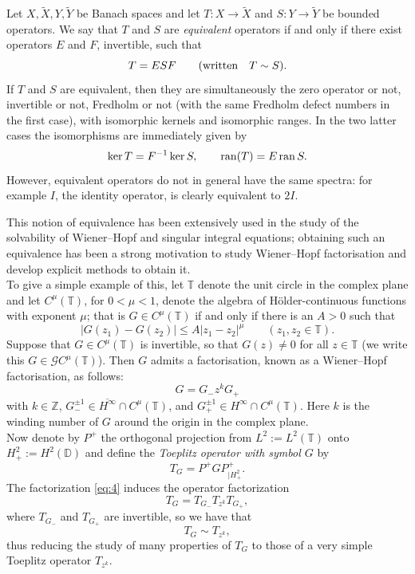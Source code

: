 \documentclass[11pt]{article}
\def\DD{\mathbb D}
\def\G{\mathcal G}
\def\TT{\mathbb T}
\def\ZZ{\mathbb Z}
\def\beq{\begin{equation}}
\def\eeq{\end{equation}}
\def\ol{\overline}
\def\wX{\widetilde X}
\def\wY{\widetilde Y}
\def\ker{\mathop{\rm ker}\nolimits}
\def\ran{\mathop{\rm ran}\nolimits}
\begin{document}
Let $X,\wX,Y,\wY$ be Banach spaces and let $T:X \to \wX$ and $S: Y \to \wY$ be bounded operators. We say that $T$ and $S$ are {\em equivalent\/} operators if and only if there exist operators $E$ and $F$, invertible, such that
\[
T=ESF \qquad (\hbox{written} \quad T \sim S).
\]
If $T$ and $S$ are equivalent, then they are simultaneously the zero operator or not,
invertible or not, Fredholm or not (with the same Fredholm defect numbers in
the first case), with isomorphic kernels and isomorphic ranges.
In the two latter cases the isomorphisms are immediately given by 
\[ 
\ker T=F^{-1}\ker S, \qquad \ran(T)= E \ran S. 
\]
However, equivalent operators do not in general have the same spectra: for example $I$, the identity
operator, is clearly equivalent to $2I$.

This notion of equivalence has been extensively  used in the study of the solvability of
Wiener--Hopf and singular integral equations; obtaining such an equivalence has been a strong motivation to study Wiener--Hopf factorisation and develop explicit methods to obtain it.\\

To give a   simple example of this, let $\TT$ denote the unit circle in the complex plane and
let $C^\mu(\TT)$, for $0< \mu < 1$, 
denote the algebra of H\"older-continuous functions with exponent $\mu$; that is
$G \in C^\mu(\TT)$ if and only if there is an $A>0$ such that
\[
 |G(z_1)-G(z_2)| \le A |z_1-z_2|^\mu \qquad (z_1,z_2 \in \TT).
\]
Suppose that $G \in C^\mu(\TT)$ is invertible, so that $G(z) \ne 0$ for all $z \in \TT$
(we write this $G \in \G C^\mu(\TT)$). Then $G$ admits a factorisation, known as a
Wiener--Hopf factorisation, as follows:
\beq\label{eq:4}
G= G_- z^k G_+
\eeq
with $k \in \ZZ$, $G^{\pm 1}_- \in \ol{H^\infty} \cap C^\mu(\TT)$, and
$G^{\pm 1}_+ \in H^\infty \cap C^\mu(\TT)$.
Here $k$ is the winding number of $G$ around the origin in the complex plane.\\

Now denote by $P^+$ the orthogonal projection from $L^2:=L^2(\TT)$ onto $H^2_+:= H^2(\DD)$ and define the {\em Toeplitz operator with symbol $G$\/} by
\beq \label{eq:5}
T_G = P^+ G P^+_{| H^2_+}.
\eeq
The factorization \eqref{eq:4}
induces the operator factorization
\[
T_G = T_{G_-} T_{z^k} T_{G_+},
\] 
where $T_{G_-}$ and $T_{G_+}$ are invertible, so we have that
\[
T_G \sim T_{z^k},
\]
thus reducing the study of many properties of $T_G$ to those of a very simple Toeplitz operator $T_{z^k}$.\\
\end{document}
